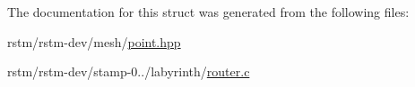 The documentation for this struct was generated from the following files\-:\begin{DoxyCompactItemize}
\item 
rstm/rstm-\/dev/mesh/\hyperlink{point_8hpp}{point.\-hpp}\item 
rstm/rstm-\/dev/stamp-\/0../labyrinth/\hyperlink{router_8c}{router.\-c}\end{DoxyCompactItemize}
